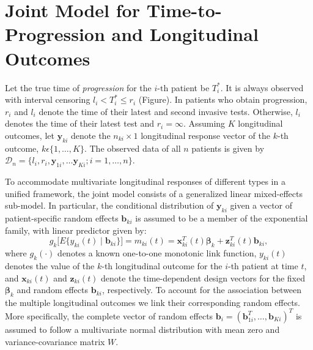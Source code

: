 \section{Joint Model for Time-to-Progression and Longitudinal Outcomes}
\label{sec:jointmodel}
Let the true time of \textit{progression} for the ${i\mbox{-th}}$ patient be $T_i^*$. It is always observed with interval censoring ${l_i < T_i^* \leq r_i}$ (Figure). In patients who obtain progression, $r_i$ and $l_i$ denote the time of their latest and second invasive tests. Otherwise, $l_i$ denotes the time of their latest test and ${r_i=\infty}$. Assuming $K$ longitudinal outcomes, let $\boldsymbol{y}_{ki}$ denote the ${n_{ki} \times 1}$ longitudinal response vector of the $k$-th outcome, $k\epsilon\{1, \ldots, K\}$. The observed data of all $n$ patients is given by ${\mathcal{D}_n = \{l_i, r_i, \boldsymbol{y}_{1i},\ldots \boldsymbol{y}_{Ki}; i = 1, \ldots, n\}}$.

To accommodate multivariate longitudinal responses of different types in a unified framework, the joint model consists of a generalized linear mixed-effects sub-model. In particular, the conditional
distribution of $\boldsymbol{y}_{ki}$ given a vector of patient-specific random effects $\boldsymbol{b}_{ki}$ is assumed to be a member of the exponential family, with linear predictor given by:
\begin{equation}
\label{eq:long_model}
g_k\big[E\{y_{ki} (t) \mid \boldsymbol{b}_{ki}\}\big] = m_{ki}(t) = \boldsymbol{x}_{ki}^T(t)\boldsymbol{\beta}_{k} + \boldsymbol{z}_{ki}^T(t)\boldsymbol{b}_{ki},
\end{equation}
where $g_k(\cdot)$ denotes a known one-to-one monotonic link function, $y_{ki}(t)$ denotes the
value of the $k$-th longitudinal outcome for the $i$-th patient at time $t$, and $\boldsymbol{x}_{ki}(t)$ and $\boldsymbol{z}_{ki}(t)$ denote the time-dependent design vectors for the fixed $\boldsymbol{\beta}_{k}$ and random effects $\boldsymbol{b}_{ki}$, respectively. To account for the association between the multiple longitudinal outcomes we link their corresponding random effects. More specifically, the complete vector of random effects ${\boldsymbol{b}_{i} =
(\boldsymbol{b}_{1i}^T, \ldots, \boldsymbol{b}_{Ki})^T}$ is assumed to follow a multivariate normal distribution with mean zero and variance-covariance matrix $W$.

